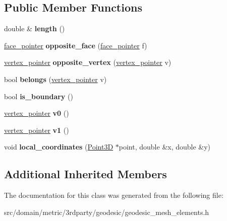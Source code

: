 \subsection*{Public Member Functions}
\begin{DoxyCompactItemize}
\item 
\hypertarget{classgeodesic_1_1_edge_a86095909b50a3a0feb2a0b9e8ac18ff8}{}double \& {\bfseries length} ()\label{classgeodesic_1_1_edge_a86095909b50a3a0feb2a0b9e8ac18ff8}

\item 
\hypertarget{classgeodesic_1_1_edge_ac6e6b51974a7b3c7a6a7cd48134c683c}{}\hyperlink{classgeodesic_1_1_face}{face\+\_\+pointer} {\bfseries opposite\+\_\+face} (\hyperlink{classgeodesic_1_1_face}{face\+\_\+pointer} f)\label{classgeodesic_1_1_edge_ac6e6b51974a7b3c7a6a7cd48134c683c}

\item 
\hypertarget{classgeodesic_1_1_edge_a353dcdc7f799bec55ef86e9248d55d01}{}\hyperlink{classgeodesic_1_1_vertex}{vertex\+\_\+pointer} {\bfseries opposite\+\_\+vertex} (\hyperlink{classgeodesic_1_1_vertex}{vertex\+\_\+pointer} v)\label{classgeodesic_1_1_edge_a353dcdc7f799bec55ef86e9248d55d01}

\item 
\hypertarget{classgeodesic_1_1_edge_a06ac8fdd1eb01bfccfb80dccf22e7600}{}bool {\bfseries belongs} (\hyperlink{classgeodesic_1_1_vertex}{vertex\+\_\+pointer} v)\label{classgeodesic_1_1_edge_a06ac8fdd1eb01bfccfb80dccf22e7600}

\item 
\hypertarget{classgeodesic_1_1_edge_a905bdb2e23940ed68c433e34afd44d31}{}bool {\bfseries is\+\_\+boundary} ()\label{classgeodesic_1_1_edge_a905bdb2e23940ed68c433e34afd44d31}

\item 
\hypertarget{classgeodesic_1_1_edge_aae82810e465b89e54df4643446b38059}{}\hyperlink{classgeodesic_1_1_vertex}{vertex\+\_\+pointer} {\bfseries v0} ()\label{classgeodesic_1_1_edge_aae82810e465b89e54df4643446b38059}

\item 
\hypertarget{classgeodesic_1_1_edge_a3ec747bf09057f61abea8da527a9e86e}{}\hyperlink{classgeodesic_1_1_vertex}{vertex\+\_\+pointer} {\bfseries v1} ()\label{classgeodesic_1_1_edge_a3ec747bf09057f61abea8da527a9e86e}

\item 
\hypertarget{classgeodesic_1_1_edge_a8c4e0d1f248b1e0a669b6666fa8398e0}{}void {\bfseries local\+\_\+coordinates} (\hyperlink{classgeodesic_1_1_point3_d}{Point3\+D} $\ast$point, double \&x, double \&y)\label{classgeodesic_1_1_edge_a8c4e0d1f248b1e0a669b6666fa8398e0}

\end{DoxyCompactItemize}
\subsection*{Additional Inherited Members}


The documentation for this class was generated from the following file\+:\begin{DoxyCompactItemize}
\item 
src/domain/metric/3rdparty/geodesic/geodesic\+\_\+mesh\+\_\+elements.\+h\end{DoxyCompactItemize}
